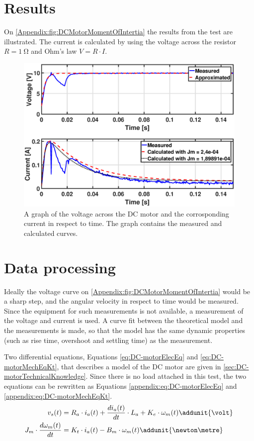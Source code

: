 \section*{Results}
On \autoref{Appendix:fig:DCMotorMomentOfIntertia} the results from the test are illustrated. The current is calculated by using the voltage across the resistor $R=\SI{1}{\ohm}$ and Ohm's law $V = R \cdot I$.
\begin{figure}[!h]
\centering
\includegraphics[width=\textwidth]{figures/test/DCMotorMomentOfInertia}
\caption{A graph of the voltage across the DC motor and the corrosponding current in respect to time. The graph contains the measured and calculated curves.}\label{Appendix:fig:DCMotorMomentOfIntertia}
\end{figure}

\section*{Data processing}
Ideally the voltage curve on \autoref{Appendix:fig:DCMotorMomentOfIntertia} would be a sharp step, and the angular velocity in respect to time would be measured. Since the equipment for such measurements is not available, a measurement of the voltage and current is used. A curve fit between the theoretical model and the measurements is made, so that the model has the same dynamic properties (such as rise time, overshoot and settling time) as the measurement.


Two differential equations, Equations \ref{eq:DC-motorElecEq} and \ref{eq:DC-motorMechEqKt}, that describes a model of the DC motor are given in \autoref{sec:DC-motorTechnicalKnowledge}. Since there is no load attached in this test, the two equations can be rewritten as Equations \ref{appendix:eq:DC-motorElecEq} and \ref{appendix:eq:DC-motorMechEqKt}.
\begin{subequations}
\begin{align}
v_{s}(t) &= R_{a}\cdot i_a(t) + \frac{d i_a(t)}{d t}\cdot L_a + K_{e}\cdot\omega_{m}(t) \addunit{\volt}\label{appendix:eq:DC-motorElecEq}\\
J_m \cdot \frac{d \omega_{m}(t)}{d t} &= K_t\cdot i_a(t)- B_m \cdot \omega_{m}(t) \addunit{\newton\metre}\label{appendix:eq:DC-motorMechEqKt}
\end{align}
\end{subequations}

